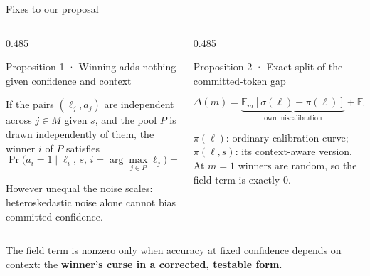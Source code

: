 \documentclass[aspectratio=169,10pt,t]{beamer}
\newcommand{\fnote}[1]{{\color{ink2}\scriptsize #1\par}}
\newcommand{\paneltitle}[1]{{\color{accentdark}\small\firasemibold #1}\par\vspace{0.8mm}}
\begin{document}
\begin{frame}{Fixes to our proposal}
  \begin{columns}[T,onlytextwidth]
    \begin{column}{0.485\textwidth}
      \begin{panel}[height=36mm]
        \paneltitle{Proposition 1 · Winning adds nothing given confidence and context}
        If the pairs $(\ell_j, a_j)$ are independent across $j \in M$ given $s$, and the pool
        $P$ is drawn independently of them, the winner $i$ of $P$ satisfies
        \[
          \Pr\big(a_i = 1 \mid \ell_i,\, s,\, i = \arg\max_{j\in P} \ell_j\big) = \pi(\ell_i, s).
        \]
        \fnote{However unequal the noise scales: heteroskedastic noise alone cannot bias
        committed confidence.}
      \end{panel}
    \end{column}
    \begin{column}{0.485\textwidth}
      \begin{panel}[height=36mm]
        \paneltitle{Proposition 2 · Exact split of the committed-token gap}
        \[
          \Delta(m) =
          \underbrace{\mathbb{E}_m[\sigma(\ell) - \pi(\ell)]}_{\text{own miscalibration}}
          + \underbrace{\mathbb{E}_m[\pi(\ell) - \pi(\ell, s)]}_{\text{field term}}
        \]
        \fnote{$\pi(\ell)$: ordinary calibration curve; $\pi(\ell,s)$: its context-aware
        version. At $m = 1$ winners are random, so the field term is exactly 0.}
      \end{panel}
    \end{column}
  \end{columns}
  \vspace{2.5mm}
  \begin{takeaway}
    The field term is nonzero only when accuracy at fixed confidence depends on context: the
    \textbf{winner's curse in a corrected, testable form}.
  \end{takeaway}
\end{frame}
\end{document}
